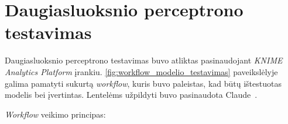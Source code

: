 \section{Daugiasluoksnio perceptrono testavimas}
\label{sec:daugiasluoksnio_perceptrono_testavimas}

Daugiasluoksnio perceptrono testavimas buvo atliktas pasinaudojant \textit{KNIME Analytics Platform} \cite{KNIME} įrankiu. \ref{fig:workflow_modelio_testavimas} paveikslėlyje galima pamatyti sukurtą \textit{workflow}, kuris buvo paleistas, kad būtų ištestuotas modelis bei įvertintas. Lentelėms užpildyti buvo pasinaudota Claude~\cite{claude_bendrai}.



\textit{Workflow} veikimo principas:



